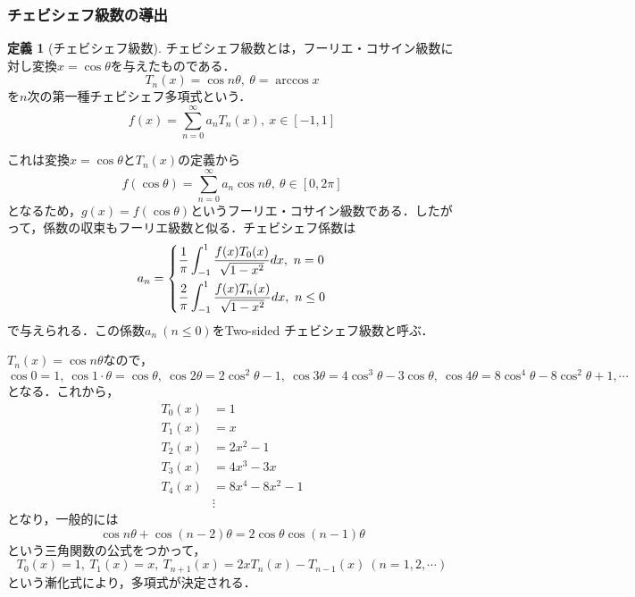 \documentclass[11pt,a4paper]{jsarticle}
\theoremstyle{definition}
\newtheorem{dfn}{定義}
\begin{document}
\subsubsection{チェビシェフ級数の導出}
\begin{dfn}[チェビシェフ級数]
  チェビシェフ級数とは，フーリエ・コサイン級数に対し変換$x=\cos \theta$を与えたものである．
  \begin{equation*}
    T_n(x) = \cos n\theta,\ \theta = \arccos x
  \end{equation*}
  を$n$次の第一種チェビシェフ多項式という．
  \begin{equation*}
    f(x)=\sum_{n=0}^{\infty} a_n T_n(x),\ x\in [-1,1]
  \end{equation*}

  これは変換$x=\cos \theta$と$T_n(x)$の定義から
  \begin{equation*}
    f(\cos \theta) = \sum_{n=0}^{\infty} a_n \cos n\theta,\ \theta\in [0,2\pi]
  \end{equation*}
  となるため，$g(x)=f(\cos \theta)$というフーリエ・コサイン級数である．したがって，係数の収束もフーリエ級数と似る．チェビシェフ係数は
  \begin{align*}
    a_n =
    \begin{dcases}
      \frac{1}{\pi} \int_{-1}^{1} \frac{f(x)T_0(x)}{\sqrt{1-x^2}}dx ,\ n=0 \\
      \frac{2}{\pi} \int_{-1}^{1} \frac{f(x)T_n(x)}{\sqrt{1-x^2}}dx ,\ n\leq 0
    \end{dcases}
  \end{align*}
  で与えられる．この係数$a_n\ (n\leq 0)$をTwo-sided チェビシェフ級数と呼ぶ．

  $T_n(x)=\cos n \theta$なので，$\cos 0=1,\ \cos 1\cdot \theta = \cos \theta,\ \cos 2\theta = 2\cos ^2 \theta -1,\ \cos 3\theta = 4\cos ^3\theta -3\cos \theta,\ \cos4 \theta = 8\cos^4\theta - 8\cos^2\theta + 1, \cdots$となる．これから，
  \begin{align*}
    T_0(x) & = 1             \\
    T_1(x) & = x             \\
    T_2(x) & = 2x^2 - 1      \\
    T_3(x) & = 4x^3 - 3x     \\
    T_4(x) & = 8x^4-8x^2 - 1 \\
           & \vdots
  \end{align*}
  となり，一般的には
  \begin{equation*}
    \cos n\theta + \cos (n-2)\theta = 2\cos \theta \cos (n-1) \theta
  \end{equation*}
  という三角関数の公式をつかって，
  \begin{equation*}
    T_0(x)=1,\ T_1(x)=x,\ T_{n+1}(x) = 2xT_n(x) - T_{n-1}(x) \ (n= 1,2,\cdots)
  \end{equation*}
  という漸化式により，多項式が決定される．


\end{dfn}
\end{document}
